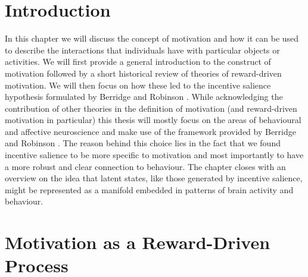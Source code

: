 \section{Introduction}
\label{motivation_engagement_introduction}
In this chapter we will discuss the concept of motivation and how it can be used to describe the interactions that individuals have with particular objects or activities. We will first provide a general introduction to the construct of motivation followed by a short historical review of theories of reward-driven motivation. We will then focus on how these led to the incentive salience hypothesis formulated by Berridge and Robinson \cite{berridge1998role}. While acknowledging the contribution of other theories in the definition of motivation (and reward-driven motivation in particular) this thesis will mostly focus on the areas of behavioural and affective neuroscience and make use of the framework provided by Berridge and Robinson \cite{berridge1998role}. The reason behind this choice lies in the fact that we found incentive salience to be more specific to motivation and most importantly to have a more robust and clear connection to behaviour. \lorem
The chapter closes with an overview on the idea that latent states, like those generated by incentive salience, might be represented as a manifold embedded in patterns of brain activity and behaviour.

\section{Motivation as a Reward-Driven Process}
\label{motivation}

